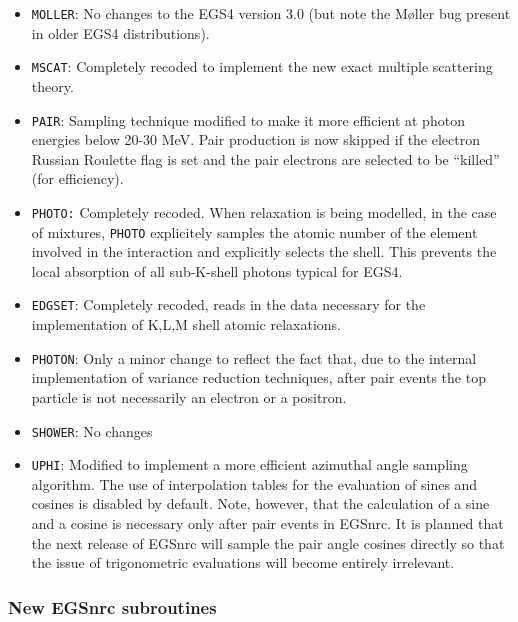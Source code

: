 \begin{itemize}
\item
{\tt MOLLER}: No changes to the EGS4 version 3.0 
(but note the M{\o}ller bug present in older 
EGS4 distributions\cite{Bi96b}).

\item
{\tt MSCAT}: Completely recoded to implement the 
new exact multiple scattering theory.

\item
{\tt PAIR}: Sampling technique modified to make it 
more efficient at photon energies below 20-30 MeV. 
Pair production is now skipped if the electron Russian Roulette 
flag is set and the pair electrons are selected to be ``killed'' 
(for efficiency).

\item
{\tt PHOTO:} Completely recoded. When relaxation is being modelled, 
in the case of mixtures, {\tt PHOTO}
explicitely samples the atomic number of the element involved in the 
interaction and explicitly selects the shell. 
This prevents the local absorption of all sub-K-shell 
photons typical for EGS4.

\item
{\tt EDGSET}: Completely recoded, reads in the data necessary 
for the implementation of K,L,M shell atomic relaxations.


\item
{\tt PHOTON}: Only a minor change to reflect the fact that, 
due to the internal implementation of variance reduction techniques, 
after pair events the top particle is not necessarily an electron 
or a positron.

\item
{\tt SHOWER}: No changes

 
\item
{\tt UPHI}: Modified to implement a more efficient azimuthal 
angle sampling algorithm. The use of interpolation tables 
for the evaluation of sines and cosines is disabled by default. 
Note, however, that the calculation of a sine and a cosine is 
necessary only after pair events in EGSnrc. It is planned 
that the next release of EGSnrc will sample the pair angle cosines 
directly so that the issue of trigonometric evaluations will become 
entirely irrelevant.
\end{itemize}

\subsubsection{New EGSnrc subroutines}

